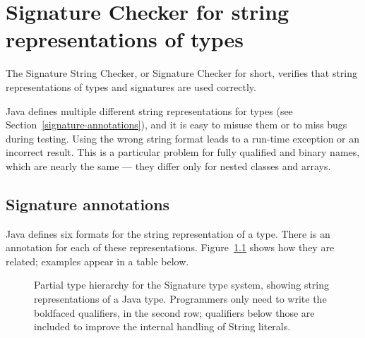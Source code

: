 \htmlhr
\chapter{Signature Checker for string representations of types\label{signature-checker}}

The Signature String Checker, or Signature Checker for short, verifies that
string representations of types and signatures are used correctly.

Java defines multiple different string representations for types (see
Section~\ref{signature-annotations}), and it is easy to
misuse them or to miss bugs during testing.  Using the wrong string format
leads to a run-time exception or an incorrect result.  This is a particular
problem for fully qualified and binary names, which are nearly the same ---
they differ only for nested classes and arrays.


\section{Signature annotations\label{signature-annotations}}

Java defines six formats for the string representation of a type.
There is an annotation for each of these representations.
Figure~\ref{fig-signature-hierarchy} shows how they are related;
examples appear in a table below.

\begin{figure}
\caption{Partial type hierarchy for the Signature type system, showing
  string representations of a Java type.  Programmers only need to write
  the boldfaced qualifiers, in the second row; qualifiers below those are
  included to improve the internal handling of String literals.}
\label{fig-signature-hierarchy}
\end{figure}

